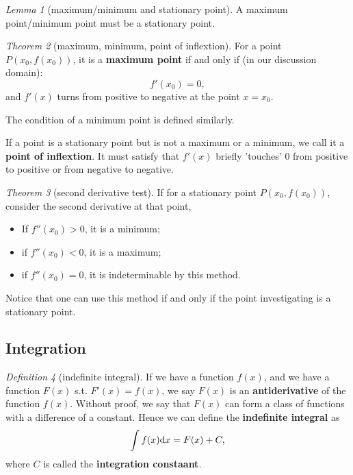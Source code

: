 \documentclass[8pt]{article}
\theoremstyle{remark}
\newtheorem{theorem}{Theorem}[section]
\newtheorem{lemma}[theorem]{Lemma}
\newtheorem{definition}[theorem]{Definition}
\begin{document}
            \begin{lemma}[maximum/minimum and stationary point]
                A maximum point/minimum point must be a stationary point.
            \end{lemma}

            \begin{theorem}[maximum, minimum, point of inflextion]
                For a point $P(x_0, f(x_0))$, it is a \textbf{maximum point} if and only if (in our discussion domain):
                $$
                    f'(x_0) = 0,
                $$
                and $f'(x)$ turns from positive to negative at the point $x = x_0$.

                The condition of a minimum point is defined similarly.

                If a point is a stationary point but is not a maximum or a minimum, we call it a \textbf{point of inflextion}. It must satisfy that $f'(x)$ briefly 'touches' $0$ from positive to positive or from negative to negative.
            \end{theorem}

            \begin{theorem}[second derivative test]
                If for a stationary point $P(x_0, f(x_0))$, consider the second derivative at that point,
                \begin{itemize}
                    \item If $f''(x_0) > 0$, it is a minimum;
                    \item if $f''(x_0) < 0$, it is a maximum;
                    \item if $f''(x_0) = 0$, it is indeterminable by this method.
                \end{itemize}
                
                Notice that one can use this method if and only if the point investigating is a stationary point. 
            \end{theorem}

        \subsection{Integration}
            \begin{definition}[indefinite integral]
                If we have a function $f(x)$, and we have a function $F(x)$ s.t. $F'(x) = f(x)$, we say $F(x)$ is an \textbf{antiderivative} of the function $f(x)$. Without proof, we say that $F(x)$ can form a class of functions with a difference of a constant. Hence we can define the \textbf{indefinite integral} as
                $$
                    \int f(x) \mathrm{d} x = F(x) + C,
                $$
                where $C$ is called the \textbf{integration constaant}.
            \end{definition}
\end{document}
